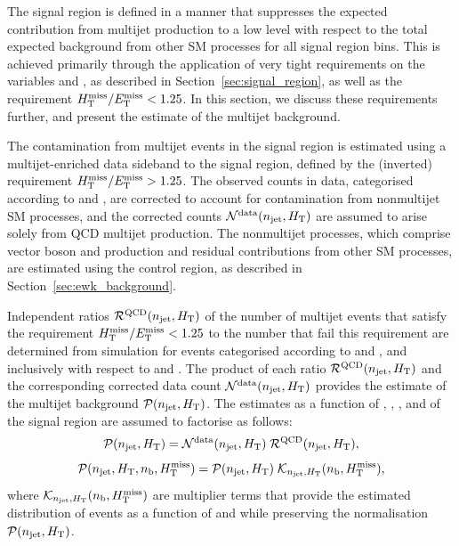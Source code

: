 The signal region is defined in a manner that suppresses the expected
contribution from multijet production to a low level with respect to
the total expected background from other SM processes for all signal
region bins. This is achieved primarily through the application of
very tight requirements on the variables \alphat and \dphi, as
described in Section~\ref{sec:signal_region}, as well as the
requirement $H_{\mathrm{T}}^{\text{miss}} / E_{\mathrm{T}}^{\text{miss}} < 1.25$. In this section, we discuss these
requirements further, and present the estimate of the multijet
background.

The contamination from multijet events in the signal region is
estimated using a multijet-enriched data sideband to the signal
region, defined by the (inverted) requirement $H_{\mathrm{T}}^{\text{miss}} / E_{\mathrm{T}}^{\text{miss}} > 1.25$. The
observed counts in data, categorised according to \njet and \scalht,
are corrected to account for contamination from nonmultijet SM
processes, and the corrected counts $\mathcal{N}^\text{data}(n_{\text{jet}},
H_{\mathrm{T}})$ are assumed to arise solely from QCD multijet
production. The nonmultijet processes, which comprise vector boson
and \ttbar production and residual contributions from other SM
processes, are estimated using the \mj control region, as
described in Section~\ref{sec:ewk_background}.

Independent ratios $\mathcal{R}^\mathrm{QCD}(n_{\text{jet}}, H_{\mathrm{T}})$ of the
number of multijet events that satisfy the requirement $H_{\mathrm{T}}^{\text{miss}} / E_{\mathrm{T}}^{\text{miss}} <
1.25$ to the number that fail this requirement are determined from
simulation for events categorised according to \njet and \scalht, and
inclusively with respect to \nb and \HTmiss. The product of each ratio
$\mathcal{R}^\mathrm{QCD}(n_{\text{jet}}, H_{\mathrm{T}})$ and the corresponding
corrected data count $\mathcal{N}^\text{data}(n_{\text{jet}}, H_{\mathrm{T}})$
provides the estimate of the multijet background $\mathcal{P}(n_{\text{jet}},
H_{\mathrm{T}})$. The estimates as a function of \njet, \scalht, \nb, and
\HTmiss of the signal region are assumed to factorise as follows:
\begin{equation}
  \label{eq:qcd1}
  \mathcal{P}( n_{\text{jet}}, H_{\mathrm{T}} )  =
  \mathcal{N}^\text{data}( n_{\text{jet}}, H_{\mathrm{T}} )\;
  \mathcal{R}^\mathrm{QCD}( n_{\text{jet}}, H_{\mathrm{T}} ),
\end{equation}
\begin{equation}
  \label{eq:qcd2}
  \mathcal{P}( n_{\text{jet}}, H_{\mathrm{T}}, n_{\text{b}}, H_{\mathrm{T}}^{\text{miss}} ) = 
  \mathcal{P}( n_{\text{jet}}, H_{\mathrm{T}} )\;
  \mathcal{K}_{n_{\text{jet}}, H_{\mathrm{T}}}( n_{\text{b}}, H_{\mathrm{T}}^{\text{miss}} ), 
\end{equation}
where $\mathcal{K}_{n_{\text{jet}}, H_{\mathrm{T}}}( n_{\text{b}}, H_{\mathrm{T}}^{\text{miss}} )$ are multiplier
terms that provide the estimated distribution of events as a function
of \nb and \HTmiss while preserving the normalisation $\mathcal{P}(
n_{\text{jet}}, H_{\mathrm{T}} )$.

